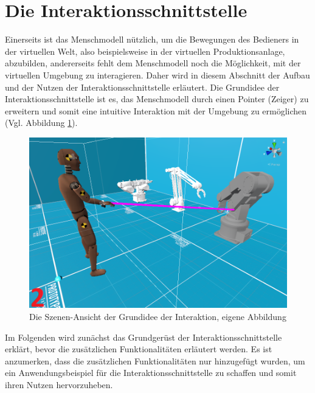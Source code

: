 \section{Die Interaktionsschnittstelle}\label{sec:DieInteraktionsschnittstelle}
Einerseits ist das Menschmodell nützlich, um die Bewegungen des Bedieners in der virtuellen Welt, also beispielsweise in der virtuellen Produktionsanlage, abzubilden, andererseits fehlt dem Menschmodell noch die Möglichkeit, mit der virtuellen Umgebung zu interagieren. Daher wird in diesem Abschnitt der Aufbau und der Nutzen der Interaktionsschnittstelle erläutert. Die Grundidee der Interaktionsschnittstelle ist es, das Menschmodell durch einen Pointer (Zeiger) zu erweitern und somit eine intuitive Interaktion mit der Umgebung zu ermöglichen (Vgl. Abbildung \ref{fig:InteraktionBeispiel}).
\begin{figure}[h]
	\centering
	\includegraphics[width=0.6\linewidth]{Bilder/A44_InteraktionsBeispiel2}
	\caption{Die Szenen-Ansicht der Grundidee der Interaktion, eigene Abbildung}
	\label{fig:InteraktionBeispiel}
\end{figure}
\newline
\noindent Im Folgenden wird zunächst das Grundgerüst der Interaktionsschnittstelle erklärt, bevor die zusätzlichen Funktionalitäten erläutert werden. Es ist anzumerken, dass die zusätzlichen Funktionalitäten nur hinzugefügt wurden, um ein Anwendungsbeispiel für die Interaktionsschnittstelle zu schaffen und somit ihren Nutzen hervorzuheben.


